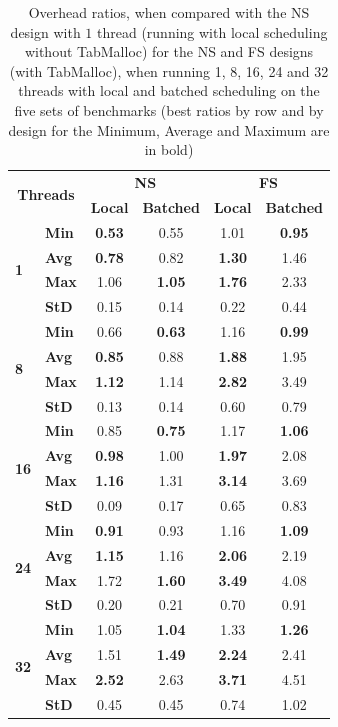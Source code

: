 \documentclass{llncs}
\begin{document}
\setlength{\tabcolsep}{12pt}

\begin{table}[!ht]
\centering
\caption{Overhead ratios, when compared with the NS design with $1$
  thread (running with local scheduling without TabMalloc) for the NS
  and FS designs (with TabMalloc), when running 1, 8, 16, 24 and 32
  threads with local and batched scheduling on the five sets of
  benchmarks (best ratios by row and by design for the Minimum,
  Average and Maximum are in bold)}
\begin{tabular}{ll|cc|cc}
\hline\hline
\multicolumn{2}{c|}{\multirow{2}{*}{\bf Threads}} &
\multicolumn{2}{c|}{\multirow{1}{*}{\bf NS}} &
\multicolumn{2}{|c}{\multirow{1}{*}{\bf FS}}\\ \cline{3-6}
& 
& \multicolumn{1}{c}{\bf Local}
& \multicolumn{1}{c}{\bf Batched}
& \multicolumn{1}{|c}{\bf Local}
& \multicolumn{1}{c}{\bf Batched}\\
\hline
\multirow{4}{*}{\bf 1}
& {\bf Min }& {\bf 0.53}& 0.55& 1.01& {\bf 0.95}\\
& {\bf Avg }& {\bf 0.78}& 0.82& {\bf 1.30}& 1.46\\
& {\bf Max }& 1.06& {\bf 1.05}& {\bf 1.76}& 2.33\\
& {\bf StD }& 0.15& 0.14& 0.22& 0.44\\
\hline
\multirow{4}{*}{\bf 8}
& {\bf Min }& 0.66& {\bf 0.63}& 1.16&{\bf  0.99}\\
& {\bf Avg }& {\bf 0.85}& 0.88& {\bf 1.88}& 1.95\\
& {\bf Max }& {\bf 1.12}& 1.14& {\bf 2.82}& 3.49\\
& {\bf StD }& 0.13& 0.14& 0.60& 0.79\\
\hline
\multirow{4}{*}{\bf 16}
& {\bf Min }& 0.85& {\bf 0.75}& 1.17& {\bf 1.06}\\
& {\bf Avg }& {\bf 0.98}& 1.00& {\bf 1.97}& 2.08\\
& {\bf Max }& {\bf 1.16}& 1.31& {\bf 3.14}& 3.69\\
& {\bf StD }& 0.09& 0.17& 0.65& 0.83\\
\hline
\multirow{4}{*}{\bf 24}
& {\bf Min }& {\bf 0.91}& 0.93& 1.16& {\bf 1.09}\\
& {\bf Avg }& {\bf 1.15}& 1.16& {\bf 2.06}& 2.19\\
& {\bf Max }& 1.72& {\bf 1.60}& {\bf 3.49}& 4.08\\
& {\bf StD }& 0.20& 0.21& 0.70& 0.91\\
\hline
\multirow{4}{*}{\bf 32}
& {\bf Min }& 1.05& {\bf 1.04}& 1.33& {\bf 1.26}\\
& {\bf Avg }& 1.51& {\bf 1.49}& {\bf 2.24}& 2.41\\
& {\bf Max }& {\bf 2.52}& 2.63& {\bf 3.71}& 4.51\\
& {\bf StD }& 0.45& 0.45& 0.74& 1.02\\
\hline\hline
\end{tabular}%
\label{tab_batched_overhead}
\end{table}
\end{document}
